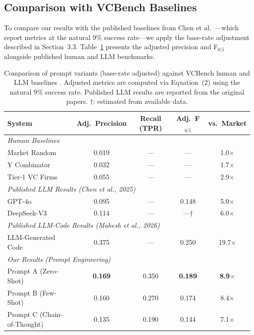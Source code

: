 \documentclass{article}
\begin{document}
\subsection{Comparison with VCBench Baselines}

To compare our results with the published baselines from Chen et al.~\cite{chen2025vcbench}---which report metrics at the natural 9\% success rate---we apply the base-rate adjustment described in Section~3.3. Table~\ref{tab:comparison} presents the adjusted precision and F$_{0.5}$ alongside published human and LLM benchmarks.

\begin{table}[h]
\centering
\caption{Comparison of prompt variants (base-rate adjusted) against VCBench human and LLM baselines \cite{chen2025vcbench,mahesh2026stochastic}. Adjusted metrics are computed via Equation~(2) using the natural 9\% success rate. Published LLM results are reported from the original papers. $\dagger$: estimated from available data.}
\label{tab:comparison}
\begin{tabular}{lcccc}
\toprule
\textbf{System} & \textbf{Adj.\ Precision} & \textbf{Recall (TPR)} & \textbf{Adj.\ F$_{0.5}$} & \textbf{vs.\ Market} \\
\midrule
\multicolumn{5}{l}{\textit{Human Baselines}} \\
Market Random                & 0.019 & --- & --- & 1.0$\times$ \\
Y Combinator                 & 0.032 & --- & --- & 1.7$\times$ \\
Tier-1 VC Firms              & 0.055 & --- & --- & 2.9$\times$ \\
\midrule
\multicolumn{5}{l}{\textit{Published LLM Results (Chen et al., 2025)}} \\
GPT-4o                       & 0.095 & --- & 0.148 & 5.0$\times$ \\
DeepSeek-V3                  & 0.114 & --- & ---$\dagger$ & 6.0$\times$ \\
\midrule
\multicolumn{5}{l}{\textit{Published LLM-Code Results (Mahesh et al., 2026)}} \\
LLM-Generated Code           & 0.375 & --- & 0.250 & 19.7$\times$ \\
\midrule
\multicolumn{5}{l}{\textit{Our Results (Prompt Engineering)}} \\
\rowcolor{bestrow}
Prompt A (Zero-Shot)         & \textbf{0.169} & 0.350 & \textbf{0.189} & \textbf{8.9}$\times$ \\
Prompt B (Few-Shot)          & 0.160 & 0.270 & 0.174 & 8.4$\times$ \\
Prompt C (Chain-of-Thought)  & 0.135 & 0.190 & 0.144 & 7.1$\times$ \\
\bottomrule
\end{tabular}
\end{table}
\end{document}
